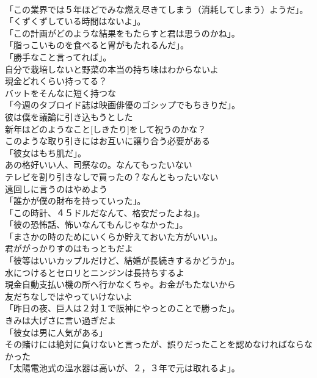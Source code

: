 \documentclass[8pt]{extreport}
\begin{document}
\begin{CJK}{UTF8}{min}
\\	「この業界では５年ほどでみな燃え尽きてしまう（消耗してしまう）ようだ」。	
\\	「くずくずしている時間はないよ」。	
\\	「この計画がどのような結果をもたらすと君は思うのかね」。	
\\	「脂っこいものを食べると胃がもたれるんだ」。	
\\	「勝手なこと言ってれば」。	
\\	自分で栽培しないと野菜の本当の持ち味はわからないよ	
\\	現金どれくらい持ってる？	
\\	バットをそんなに短く持つな	
\\	「今週のタブロイド誌は映画俳優のゴシップでもちきりだ」。	
\\	彼は僕を議論に引き込もうとした	
\\	新年はどのようなこと[しきたり]をして祝うのかな？	
\\	このような取り引きにはお互いに譲り合う必要がある	
\\	「彼女はもち肌だ」。	
\\	あの格好いい人、司祭なの。なんてもったいない	
\\	テレビを割り引きなしで買ったの？なんともったいない	
\\	遠回しに言うのはやめよう	
\\	「誰かが僕の財布を持っていった」。	
\\	「この時計、４５ドルだなんて、格安だったよね」。	
\\	「彼の恐怖話、怖いなんてもんじゃなかった」。	
\\	「まさかの時のためにいくらか貯えておいた方がいい」。	
\\	君ががっかりすのはもっともだよ	
\\	「彼等はいいカップルだけど、結婚が長続きするかどうか」。	
\\	水につけるとセロリとニンジンは長持ちするよ	
\\	現金自動支払い機の所へ行かなくちゃ。お金がもたないから	
\\	友だちなしではやっていけないよ	
\\	「昨日の夜、巨人は２対１で阪神にやっとのことで勝った」。	
\\	きみは大げさに言い過ぎだよ	
\\	「彼女は男に人気がある」	
\\	その賭けには絶対に負けないと言ったが、誤りだったことを認めなければならなかった	
\\	「太陽電池式の温水器は高いが、２，３年で元は取れるよ」。	

\end{CJK}
\end{document}
